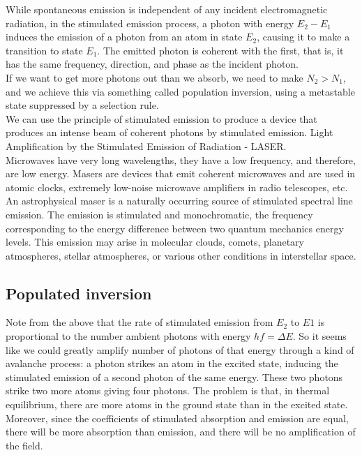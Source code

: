 \documentclass[11pt]{article}
\theoremstyle{break}
\theoremstyle{break}
\begin{document}
While spontaneous emission is independent of any incident electromagnetic radiation, in the stimulated emission process, a photon with energy $E_2 - E_1$ induces the emission of a photon from an atom in state $E_2$, causing it to make a transition to state $E_1$. The emitted photon is coherent with the first, that is, it has the same frequency, direction, and phase as the incident photon.\\

If we want to get more photons out than we absorb, we need to make $N_2>N_1$, and we achieve this via something called population inversion, using a metastable state suppressed by a selection rule.\\


We can use the principle of stimulated emission to produce  a  device  that produces  an  intense  beam  of  coherent  photons  by  stimulated  emission. Light Amplification by the Stimulated Emission of Radiation - LASER.\\


Microwaves have very long wavelengths, they have a low frequency, and therefore, are low energy. Masers are devices that emit coherent microwaves and are used in atomic clocks, extremely low-noise microwave amplifiers in radio telescopes, etc. An astrophysical maser is a naturally occurring source of stimulated spectral line emission. The emission is stimulated and monochromatic, the frequency corresponding to the energy difference between two quantum mechanics energy levels. This emission may arise in molecular clouds, comets, planetary atmospheres, stellar atmospheres, or various other conditions in interstellar space.\\

\subsection{Populated inversion}
Note from the above that the rate of stimulated emission from $E_2$ to $E1$ is proportional to the number ambient photons with energy $hf = \Delta E$. So it seems like we could greatly amplify number of photons of that energy through a kind of avalanche process: a photon strikes an atom in the excited state, inducing the
stimulated emission of a second photon of the same energy. These two photons strike two more atoms giving four photons. The problem is that, in thermal equilibrium, there are more atoms in the ground state than in the excited state. Moreover, since the coefficients of stimulated absorption and emission are equal, there will be more absorption than emission, and there will be no amplification of the field.\\
\end{document}
